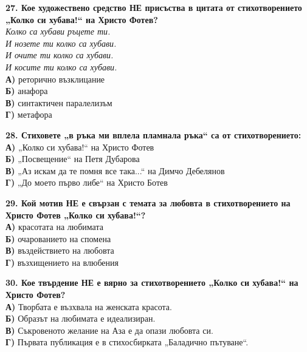 \documentclass[12pt,a4paper]{article}
\begin{document}
\noindent
\textbf{27. Кое художествено средство НЕ присъства в цитата от стихотворението „Колко си хубава!“ на Христо Фотев?} \\
\textit{Колко са хубави ръцете ти.} \\
\textit{И нозете ти колко са хубави.} \\
\textit{И очите ти колко са хубави.} \\
\textit{И косите ти колко са хубави.} \\
\noindent
\textbf{А)} реторично възклицание \\
\textbf{Б)} анафора \\
\textbf{В)} синтактичен паралелизъм \\
\textbf{Г)} метафора

\vspace{0.6cm}

\noindent
\textbf{28. Стиховете „в ръка ми вплела пламнала ръка“ са от стихотворението:} \\
\noindent
\textbf{А)} „Колко си хубава!“ на Христо Фотев \\
\textbf{Б)} „Посвещение“ на Петя Дубарова \\
\textbf{В)} „Аз искам да те помня все така...“ на Димчо Дебелянов \\
\textbf{Г)} „До моето първо либе“ на Христо Ботев

\vspace{0.6cm}

\noindent
\textbf{29. Кой мотив НЕ е свързан с темата за любовта в стихотворението на Христо Фотев „Колко си хубава!“?} \\
\noindent
\textbf{А)} красотата на любимата \\
\textbf{Б)} очарованието на спомена \\
\textbf{В)} въздействието на любовта \\
\textbf{Г)} възхищението на влюбения

\vspace{0.6cm}

\noindent
\textbf{30. Кое твърдение НЕ е вярно за стихотворението „Колко си хубава!“ на Христо Фотев?} \\
\noindent
\textbf{А)} Творбата е възхвала на женската красота. \\
\textbf{Б)} Образът на любимата е идеализиран. \\
\textbf{В)} Съкровеното желание на Аза е да опази любовта си. \\
\textbf{Г)} Първата публикация е в стихосбирката „Баладично пътуване“.
\end{document}
